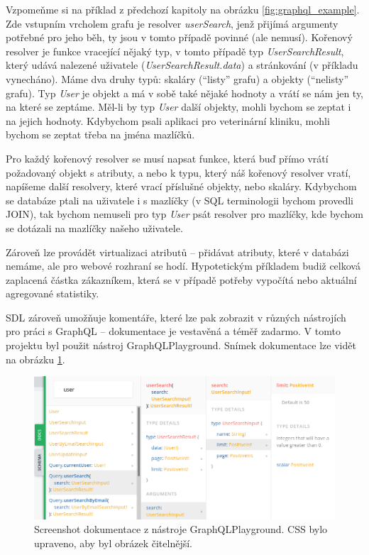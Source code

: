 Vzpomeňme si na příklad z předchozí kapitoly na obrázku \ref{fig:graphql_example}.
Zde vstupním vrcholem grafu je resolver \textit{userSearch}, jenž přijímá argumenty potřebné pro jeho běh, ty jsou v tomto případě
povinné (ale nemusí). Kořenový resolver je funkce vracející nějaký typ, v tomto případě typ \textit{UserSearchResult}, který udává nalezené
uživatele (\textit{UserSearchResult.data}) a stránkování (v příkladu vynecháno).
Máme dva druhy typů: skaláry (``listy'' grafu) a objekty (``nelisty'' grafu).
Typ \textit{User} je objekt a má v sobě také nějaké hodnoty a vrátí se nám jen ty, na které se zeptáme. Měl-li by typ \textit{User}
další objekty, mohli bychom se zeptat i na jejich hodnoty. Kdybychom psali aplikaci pro veterinární kliniku, mohli bychom se zeptat
třeba na jména mazlíčků.

Pro každý kořenový resolver se musí napsat funkce, která buď přímo vrátí požadovaný objekt s atributy, a nebo
k typu, který náš kořenový resolver vratí, napíšeme další resolvery, které vrací příslušné objekty, nebo skaláry.
Kdybychom se databáze ptali na uživatele i s
mazlíčky (v SQL terminologii bychom provedli JOIN), tak bychom nemuseli pro typ \textit{User} psát resolver pro mazlíčky, kde bychom
se dotázali na mazlíčky našeho uživatele.
\citep[][]{GraphQLDoc}

Zároveň lze provádět virtualizaci atributů -- přidávat atributy, které v databázi nemáme, ale pro webové rozhraní se hodí.
Hypotetickým příkladem budiž celková zaplacená částka zákazníkem, která se v případě potřeby vypočítá nebo aktuální agregované statistiky.

SDL zároveň umožňuje komentáře, které lze pak zobrazit v různých nástrojích pro práci s GraphQL --
dokumentace je vestavěná a téměř zadarmo.
V tomto projektu byl použit nástroj GraphQLPlayground. Snímek dokumentace lze vidět na obrázku \ref{fig:graphql_doc}.

\begin{figure}[htb!]
  \includegraphics[width=145mm]{../img/gql_doc.png}
  \caption[Screenshot dokumentace z nástroje GraphQLPlayground.]{Screenshot dokumentace z nástroje GraphQLPlayground.
  CSS bylo upraveno, aby byl obrázek čitelnější.}
  \label{fig:graphql_doc}
\end{figure}

